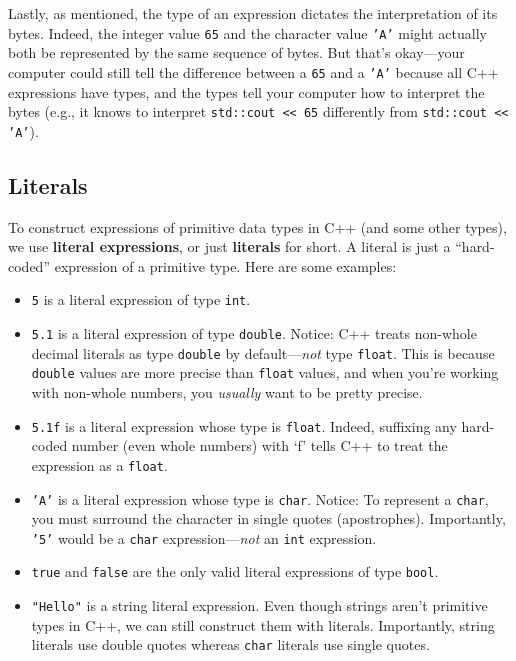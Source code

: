 \documentclass{article}
\begin{document}
Lastly, as mentioned, the type of an expression dictates the interpretation of its bytes. Indeed, the integer value \texttt{65} and the character value \texttt{'A'} might actually both be represented by the same sequence of bytes. But that's okay---your computer could still tell the difference between a \texttt{65} and a \texttt{'A'} because all C++ expressions have types, and the types tell your computer how to interpret the bytes (e.g., it knows to interpret \texttt{std::cout << 65} differently from \texttt{std::cout << 'A'}).

\subsection{Literals}

To construct expressions of primitive data types in C++ (and some other types), we use \textbf{literal expressions}, or just \textbf{literals} for short. A literal is just a ``hard-coded'' expression of a primitive type. Here are some examples:

\begin{itemize}
    \item \texttt{5} is a literal expression of type \texttt{int}.
    \item \texttt{5.1} is a literal expression of type \texttt{double}. Notice: C++ treats non-whole decimal literals as type \texttt{double} by default---\textit{not} type \texttt{float}. This is because \texttt{double} values are more precise than \texttt{float} values, and when you're working with non-whole numbers, you \textit{usually} want to be pretty precise.
    \item \texttt{5.1f} is a literal expression whose type is \texttt{float}. Indeed, suffixing any hard-coded number (even whole numbers) with `f' tells C++ to treat the expression as a \texttt{float}.
    \item \texttt{'A'} is a literal expression whose type is \texttt{char}. Notice: To represent a \texttt{char}, you must surround the character in single quotes (apostrophes). Importantly, \texttt{'5'} would be a \texttt{char} expression---\textit{not} an \texttt{int} expression.
    \item \texttt{true} and \texttt{false} are the only valid literal expressions of type \texttt{bool}.
    \item \texttt{"Hello"} is a string literal expression. Even though strings aren't primitive types in C++, we can still construct them with literals. Importantly, string literals use double quotes whereas \texttt{char} literals use single quotes.
\end{itemize}
\end{document}
